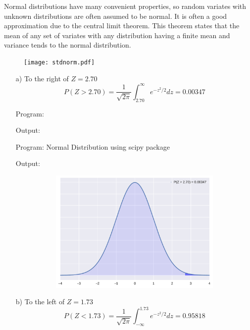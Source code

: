 \documentclass[a4paper,10pt,openright]{report}
\begin{document}
\begin{enumerate}
Normal distributions have many convenient properties, so random variates with unknown
distributions are often assumed to be normal. It is often a good approximation due to the
central limit theorem. This theorem states that the mean of any set of variates with any 
distribution having a finite mean and variance tends to the normal distribution. \\

\begin{figure}[ht!]
\texttt{[image: stdnorm.pdf]}
\centering
\end{figure}

\pagebreak

\begin{enumerate}

\item[a)] To the right of $Z = 2.70$
\begin{equation*}
P(Z > 2.70) = \frac{1}{\sqrt{2\pi}} \int_{2.70}^{\infty} e^{-z^{2}/2} dz = 0.00347
\end{equation*}

\vspace{1cm}

Program:

Output:


\vspace{1cm}

Program: Normal Distribution using scipy package

Output:


\begin{figure}[ht!]
\includegraphics[width=12cm,height=6cm,keepaspectratio]{norm1a.pdf}
\centering
\end{figure}

\item[b)] To the left of $Z = 1.73$
\begin{equation*}
P(Z < 1.73) = \frac{1}{\sqrt{2\pi}} \int_{-\infty}^{1.73} e^{-z^{2}/2} dz = 0.95818
\end{equation*}


\end{enumerate}
\end{enumerate}
\end{document}
